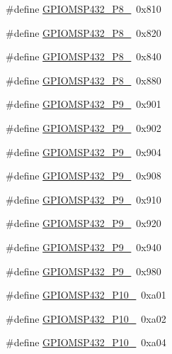\begin{DoxyCompactItemize}
\item 
\#define \hyperlink{_g_p_i_o_m_s_p432_8h_a64ca633a3ac31f47866d72ed9dfd3a97}{G\+P\+I\+O\+M\+S\+P432\+\_\+\+P8\+\_}~0x810
\item 
\#define \hyperlink{_g_p_i_o_m_s_p432_8h_ab289efd9016a134f747f5cbe918eae1c}{G\+P\+I\+O\+M\+S\+P432\+\_\+\+P8\+\_}~0x820
\item 
\#define \hyperlink{_g_p_i_o_m_s_p432_8h_a5d89e699b1f8316e10c9aca9da35fa37}{G\+P\+I\+O\+M\+S\+P432\+\_\+\+P8\+\_}~0x840
\item 
\#define \hyperlink{_g_p_i_o_m_s_p432_8h_a7b7718aeed5aa938f5c1f9e79b63e59e}{G\+P\+I\+O\+M\+S\+P432\+\_\+\+P8\+\_}~0x880
\item 
\#define \hyperlink{_g_p_i_o_m_s_p432_8h_afa301842d72945b730c0b204df82f41b}{G\+P\+I\+O\+M\+S\+P432\+\_\+\+P9\+\_}~0x901
\item 
\#define \hyperlink{_g_p_i_o_m_s_p432_8h_ad596d5c03aeb153db638795775148edf}{G\+P\+I\+O\+M\+S\+P432\+\_\+\+P9\+\_}~0x902
\item 
\#define \hyperlink{_g_p_i_o_m_s_p432_8h_a29fec81f233a1c5d965405df85bc4c56}{G\+P\+I\+O\+M\+S\+P432\+\_\+\+P9\+\_}~0x904
\item 
\#define \hyperlink{_g_p_i_o_m_s_p432_8h_aaa244cc09a3b4bb30e645be28e20162d}{G\+P\+I\+O\+M\+S\+P432\+\_\+\+P9\+\_}~0x908
\item 
\#define \hyperlink{_g_p_i_o_m_s_p432_8h_ae58f821deb15cb2d2781f1434c83bf04}{G\+P\+I\+O\+M\+S\+P432\+\_\+\+P9\+\_}~0x910
\item 
\#define \hyperlink{_g_p_i_o_m_s_p432_8h_a149003de1d44dbd34f7650d45f896a82}{G\+P\+I\+O\+M\+S\+P432\+\_\+\+P9\+\_}~0x920
\item 
\#define \hyperlink{_g_p_i_o_m_s_p432_8h_ae2b526b053e307a432921c94e922c7c2}{G\+P\+I\+O\+M\+S\+P432\+\_\+\+P9\+\_}~0x940
\item 
\#define \hyperlink{_g_p_i_o_m_s_p432_8h_a3837f1c02bd93d11c81d73ed43d663f4}{G\+P\+I\+O\+M\+S\+P432\+\_\+\+P9\+\_}~0x980
\item 
\#define \hyperlink{_g_p_i_o_m_s_p432_8h_afc04e9ca2cda5b6e2eb361e18faa2216}{G\+P\+I\+O\+M\+S\+P432\+\_\+\+P10\+\_}~0xa01
\item 
\#define \hyperlink{_g_p_i_o_m_s_p432_8h_a1512f3feb4b55761e7ebaf034c63fb0b}{G\+P\+I\+O\+M\+S\+P432\+\_\+\+P10\+\_}~0xa02
\item 
\#define \hyperlink{_g_p_i_o_m_s_p432_8h_ac3315d2521fa054e71bd646045fc7d6c}{G\+P\+I\+O\+M\+S\+P432\+\_\+\+P10\+\_}~0xa04
\item 

\end{DoxyCompactItemize}
